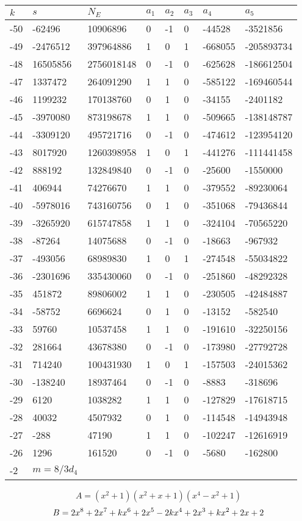 \documentclass{amsart}
\begin{document}
\begin{longtable}{|l|l|l|lllll|}
\hline
$k$ & $s$ & $N_E$ & $a_1$ & $a_2$ & $a_3$ & $a_4$ & $a_5$\\
\hline
-50&-62496&10906896&0&-1&0&-44528&-3521856\\
-49&-2476512&397964886&1&0&1&-668055&-205893734\\
-48&16505856&2756018148&0&-1&0&-625628&-186612504\\
-47&1337472&264091290&1&1&0&-585122&-169460544\\
-46&1199232&170138760&0&1&0&-34155&-2401182\\
-45&-3970080&873198678&1&1&0&-509665&-138148787\\
-44&-3309120&495721716&0&-1&0&-474612&-123954120\\
-43&8017920&1260398958&1&0&1&-441276&-111441458\\
-42&888192&132849840&0&-1&0&-25600&-1550000\\
-41&406944&74276670&1&1&0&-379552&-89230064\\
-40&-5978016&743160756&0&1&0&-351068&-79436844\\
-39&-3265920&615747858&1&1&0&-324104&-70565220\\
-38&-87264&14075688&0&-1&0&-18663&-967932\\
-37&-493056&68989830&1&0&1&-274548&-55034822\\
-36&-2301696&335430060&0&-1&0&-251860&-48292328\\
-35&451872&89806002&1&1&0&-230505&-42484887\\
-34&-58752&6696624&0&1&0&-13152&-582540\\
-33&59760&10537458&1&1&0&-191610&-32250156\\
-32&281664&43678380&0&-1&0&-173980&-27792728\\
-31&714240&100431930&1&0&1&-157503&-24015362\\
-30&-138240&18937464&0&-1&0&-8883&-318696\\
-29&6120&1038282&1&1&0&-127829&-17618715\\
-28&40032&4507932&0&1&0&-114548&-14943948\\
-27&-288&47190&1&1&0&-102247&-12616919\\
-26&1296&161520&0&-1&0&-5680&-162800\\
-2&$m=8/3d_{4}$&&\multicolumn{5}{c|}{}\\
\hline
\end{longtable}
$$A=(x^2
 + 1)(x^2
 + x
 + 1)(x^4
 - x^2
 + 1)$$
$$B=2\*x^8
 + 2\*x^7
 + k\*x^6
 + 2\*x^5
 - 2\*k\*x^4
 + 2\*x^3
 + k\*x^2
 + 2\*x
 + 2$$
\end{document}
